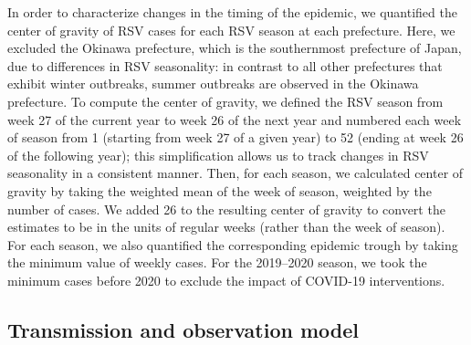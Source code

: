 \documentclass[12pt]{article}
\begin{document}
In order to characterize changes in the timing of the epidemic, we quantified the center of gravity of RSV cases for each RSV season at each prefecture.
Here, we excluded the Okinawa prefecture, which is the southernmost prefecture of Japan, due to differences in RSV seasonality:
in contrast to all other prefectures that exhibit winter outbreaks, summer outbreaks are observed in the Okinawa prefecture.
To compute the center of gravity, we defined the RSV season from week 27 of the current year to week 26 of the next year and numbered each week of season from 1 (starting from week 27 of a given year) to 52 (ending at week 26 of the following year);
this simplification allows us to track changes in RSV seasonality in a consistent manner.
Then, for each season, we calculated center of gravity by taking the weighted mean of the week of season, weighted by the number of cases.
We added 26 to the resulting center of gravity to convert the estimates to be in the units of regular weeks (rather than the week of season).
For each season, we also quantified the corresponding epidemic trough by taking the minimum value of weekly cases.
For the 2019--2020 season, we took the minimum cases before 2020 to exclude the impact of COVID-19 interventions.

\subsection*{Transmission and observation model}
\end{document}
